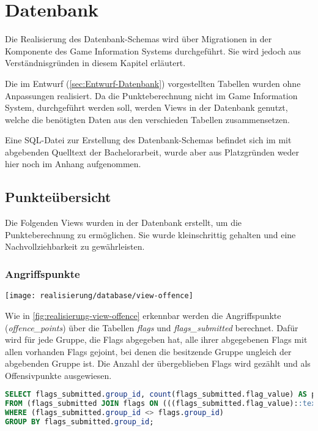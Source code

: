 \section{Datenbank}

Die Realisierung des Datenbank-Schemas wird über Migrationen in der Komponente des Game Information Systems durchgeführt. Sie wird jedoch aus Verständnisgründen in diesem Kapitel erläutert.

Die im Entwurf (\autoref{sec:Entwurf-Datenbank}) vorgestellten Tabellen wurden ohne Anpassungen realisiert. Da die Punkteberechnung nicht im Game Information System, durchgeführt werden soll, werden Views in der Datenbank genutzt, welche die benötigten Daten aus den verschieden Tabellen zusammensetzen.

Eine SQL-Datei zur Erstellung des Datenbank-Schemas befindet sich im mit abgebenden Quelltext der Bachelorarbeit, wurde aber aus Platzgründen weder hier noch im Anhang aufgenommen.

\subsection{Punkteübersicht}
Die Folgenden Views wurden in der Datenbank erstellt, um die Punkteberechnung zu ermöglichen. Sie wurde kleinschrittig gehalten und eine Nachvollziehbarkeit zu gewährleisten.

\subsubsection{Angriffspunkte}\label{subsubsec:Angriffspunkte}
\begin{center}
	\texttt{[image: realisierung/database/view-offence]}
	\label{fig:realisierung-view-offence}
\end{center}

Wie in \autoref{fig:realisierung-view-offence} erkennbar werden die Angriffspunkte (\textit{offence\_points}) über die Tabellen \textit{flags} und \textit{flags\_submitted} berechnet. Dafür wird für jede Gruppe, die Flags abgegeben hat, alle ihrer abgegebenen Flags mit allen vorhanden Flags gejoint, bei denen die besitzende Gruppe ungleich der abgebenden Gruppe ist. Die Anzahl der übergeblieben Flags wird gezählt und als Offensivpunkte ausgewiesen.

\begin{lstlisting}[frame=single, language=sql, caption={SQL View Angriffspunkte}, captionpos=b, label={lst:database-offence-points}]
SELECT flags_submitted.group_id, count(flags_submitted.flag_value) AS points
FROM (flags_submitted JOIN flags ON (((flags_submitted.flag_value)::text = (flags.flag_value)::text)))
WHERE (flags_submitted.group_id <> flags.group_id)
GROUP BY flags_submitted.group_id;
\end{lstlisting}

